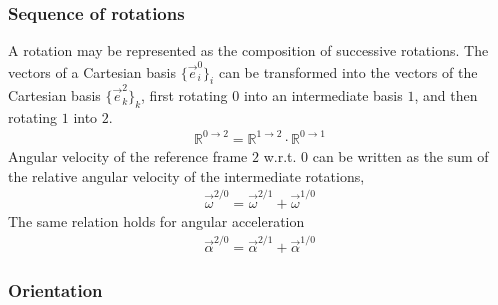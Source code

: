 \documentclass[letterpaper,10pt,english]{jupyterBook}
\begin{document}
\subsubsection{Sequence of rotations}
\label{\detokenize{ch/kinematics-rotations-tensors:sequence-of-rotations}}\label{\detokenize{ch/kinematics-rotations-tensors:classical-mechanics-kinematics-rotations-tensor-successive}}
\sphinxAtStartPar
A rotation may be represented as the composition of successive rotations. The vectors of a Cartesian basis \(\{ \vec{e}_i^0 \}_i\) can be transformed into the vectors of the Cartesian basis \(\{ \vec{e}_k^2 \}_k\), first rotating \(0\) into an intermediate basis \(1\), and then rotating \(1\) into \(2\).
\begin{equation}\label{equation:ch/kinematics-rotations-tensors:eq:rot:sequence:rot}
\begin{split}\mathbb{R}^{0 \rightarrow 2} = \mathbb{R}^{1 \rightarrow 2} \cdot \mathbb{R}^{0 \rightarrow 1}\end{split}
\end{equation}
\sphinxAtStartPar
Angular velocity of the reference frame \(2\) w.r.t. \(0\) can be written as the sum of the relative angular velocity of the intermediate rotations,
\begin{equation}\label{equation:ch/kinematics-rotations-tensors:eq:rot:sequence:vel}
\begin{split}\vec{\omega}^{2/0} = \vec{\omega}^{2/1} + \vec{\omega}^{1/0}\end{split}
\end{equation}
\sphinxAtStartPar
The same relation holds for angular acceleration
\begin{equation}\label{equation:ch/kinematics-rotations-tensors:eq:rot:sequence:acc}
\begin{split}\vec{\alpha}^{2/0} = \vec{\alpha}^{2/1} + \vec{\alpha}^{1/0}\end{split}
\end{equation}\subsubsection*{Orientation}
\end{document}
